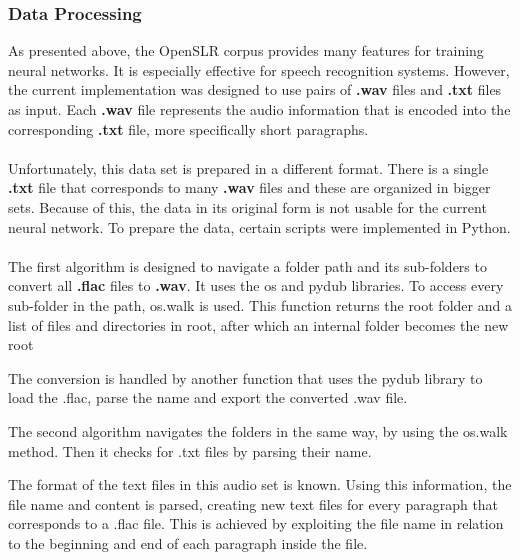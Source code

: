 \subsubsection{Data Processing}
As presented above, the OpenSLR corpus provides many features for training neural networks. It is especially effective for speech recognition systems. However, the current implementation was designed to use pairs of \textbf{.wav} files and \textbf{.txt} files as input. Each \textbf{.wav} file represents the audio information that is encoded into the corresponding \textbf{.txt} file, more specifically short paragraphs.\\\\
Unfortunately, this data set is prepared in a different format. There is a single \textbf{.txt} file that corresponds to many \textbf{.wav} files and these are organized in bigger sets. Because of this, the data in its original form is not usable for the current neural network. To prepare the data, certain scripts were implemented in Python.\\\\
The first algorithm is designed to navigate a folder path and its sub-folders to convert all \textbf{.flac} files to \textbf{.wav}. It uses the os and pydub libraries.
To access every sub-folder in the path, os.walk is used. This function returns the root folder and a list of files and directories in root, after which an internal folder becomes the new root

The conversion is handled by another function that uses the pydub library to load the .flac, parse the name and export the converted .wav file.

The second algorithm navigates the folders in the same way, by using the os.walk method. Then it checks for .txt files by parsing their name. 

The format of the text files in this audio set is known. Using this information, the file name and content is parsed, creating new text files for every paragraph that corresponds to a .flac file. This is achieved by exploiting the file name in relation to the beginning and end of each paragraph inside the file.
 
 
